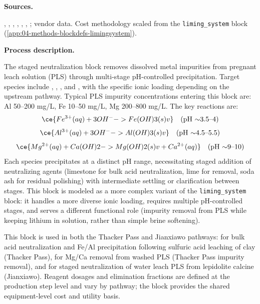 \medskip
\noindent\textbf{Sources.}\quad

\citet{sgscanadaincSK1300Technical2024}, \citet{battagliaRecoveryLithiumCarbonate2022}, \citet{liuProcessAnalysisStudy2021}, \citet{dengSystematicReviewSulfate2026}, \citet{yanExtractionLithiumLepidolite2012}, \citet{ausimmMonograph27Cost}, \citet{petersPlantDesignEconomics1991}; vendor data. Cost methodology scaled from the \texttt{liming\_system} block (\ref{app:04-methods-blockdefs-limingsystem}).

\medskip
\noindent\textbf{Process description.}\quad

The staged neutralization block removes dissolved metal impurities from pregnant leach solution (PLS) through multi-stage pH-controlled precipitation. Target species include , , , and , with the specific ionic loading depending on the upstream pathway. Typical PLS impurity concentrations entering this block are: Al 50--200 mg/L, Fe 10--50 mg/L, Mg 200--800 mg/L. The key reactions are:
\begin{equation}
	\ce{Fe^{3+}(aq) + 3OH^{-} -> Fe(OH)3(s) v} \quad\text{(pH $\sim$3.5--4)}
\end{equation}
\begin{equation}
	\ce{Al^{3+}(aq) + 3OH^{-} -> Al(OH)3(s) v} \quad\text{(pH $\sim$4.5--5.5)}
\end{equation}
\begin{equation}
	\ce{Mg^{2+}(aq) + Ca(OH)2 -> Mg(OH)2(s) v + Ca^{2+}(aq)} \quad\text{(pH $\sim$9--10)}
\end{equation}
Each species precipitates at a distinct pH range, necessitating staged addition of neutralizing agents (limestone for bulk acid neutralization, lime for  removal, soda ash for residual  polishing) with intermediate settling or clarification between stages. This block is modeled as a more complex variant of the \texttt{liming\_system} block: it handles a more diverse ionic loading, requires multiple pH-controlled stages, and serves a different functional role (impurity removal from PLS while keeping lithium in solution, rather than simple brine softening).

This block is used in both the Thacker Pass and Jianxiawo pathways: for bulk acid neutralization and Fe/Al precipitation following sulfuric acid leaching of clay (Thacker Pass), for Mg/Ca removal from washed PLS (Thacker Pass impurity removal), and for staged neutralization of water leach PLS from lepidolite calcine (Jianxiawo). Reagent dosages and elimination fractions are defined at the production step level and vary by pathway; the block provides the shared equipment-level cost and utility basis.

